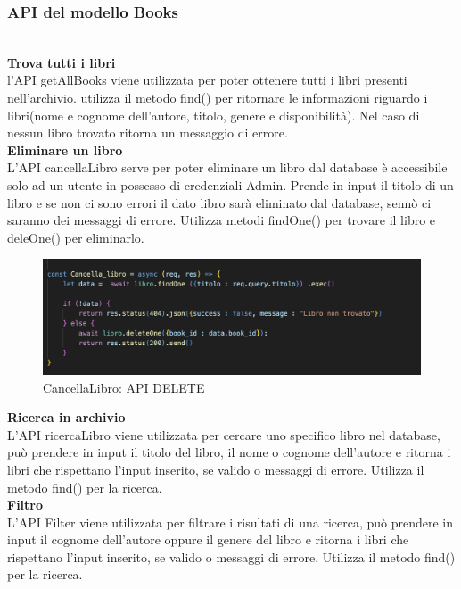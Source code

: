 \documentclass{article}
\begin{document}
\subsubsection{API del modello Books}\\

\noindent \textbf{Trova tutti i libri}\\
l'API getAllBooks viene utilizzata per poter ottenere tutti i libri presenti nell'archivio. utilizza il metodo find() per ritornare le informazioni riguardo i libri(nome e cognome dell'autore, titolo, genere e disponibilità).
Nel caso di nessun libro trovato ritorna un messaggio di errore.\\

\noindent \textbf{Eliminare un libro}\\
L'API cancellaLibro serve per poter eliminare un libro dal database è accessibile solo ad un utente in possesso di credenziali Admin.
Prende in input il titolo di un  libro e se non ci sono errori il dato libro sarà eliminato dal database, sennò ci saranno dei messaggi di errore.
Utilizza metodi findOne() per trovare il libro e deleOne() per eliminarlo. \\
\begin{figure}[H]
    \centering
    \includegraphics[width=120mm]{D4/Images/APIDelete.png}
    \caption{CancellaLibro: API DELETE}
\end{figure}

\noindent \textbf{Ricerca in archivio}\\
L'API ricercaLibro viene utilizzata per cercare uno specifico libro nel database, può prendere in input il titolo del libro, il nome o cognome dell'autore e ritorna i libri che rispettano l'input inserito, se valido o messaggi di errore.
Utilizza il metodo find() per la ricerca.\\

\noindent \textbf{Filtro}\\
L'API Filter viene utilizzata per filtrare i risultati di una ricerca, può prendere in input il cognome dell'autore oppure il genere del libro e ritorna i libri che rispettano l'input inserito, se valido o messaggi di errore.
Utilizza il metodo find() per la ricerca.\\
\end{document}
